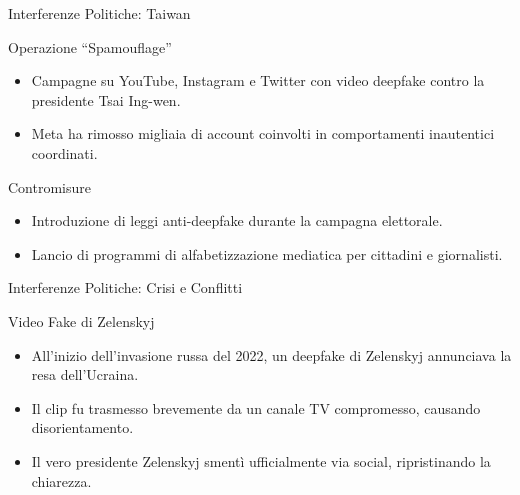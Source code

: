 \documentclass[12pt]{beamer}
\begin{document}
\begin{frame}{Interferenze Politiche: Taiwan}
  \small
  \begin{alertblock}{Operazione “Spamouflage”}
    \begin{itemize}
      \item Campagne su YouTube, Instagram e Twitter con video deepfake contro la presidente Tsai Ing-wen.\cite{milmo2024china}
      \item Meta ha rimosso migliaia di account coinvolti in comportamenti inautentici coordinati.
    \end{itemize}
  \end{alertblock}
  \begin{alertblock}{Contromisure}
    \begin{itemize}
      \item Introduzione di leggi anti-deepfake durante la campagna elettorale.  
      \item Lancio di programmi di alfabetizzazione mediatica per cittadini e giornalisti.
    \end{itemize}
  \end{alertblock}
\end{frame}

\begin{frame}{Interferenze Politiche: Crisi e Conflitti}
  \small
  \begin{alertblock}{Video Fake di Zelenskyj}
    \begin{itemize}
      \item All’inizio dell’invasione russa del 2022, un deepfake di Zelenskyj annunciava la resa dell’Ucraina.\cite{wakefield2022deepfake,}
      \item Il clip fu trasmesso brevemente da un canale TV compromesso, causando disorientamento.
      \item Il vero presidente Zelenskyj smentì ufficialmente via social, ripristinando la chiarezza.
    \end{itemize}
  \end{alertblock}
\end{frame}


\end{document}
